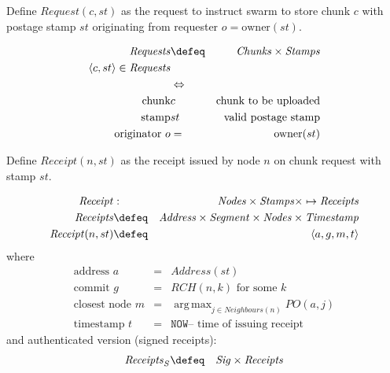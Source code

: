 \begin{definition}
\label{def:push-sync-request}
Define  $\mathit{Request}(c,st)$ as the request  to instruct swarm to store chunk $c$ with postage stamp $st$ originating from requester $o=\mathrm{owner}(st)$. 

\begin{eqnarray}
\mathit{Requests}&\defeq&\mathit{Chunks}\times\mathit{Stamps}\\ 
\langle c, st\rangle\in\mathit{Requests} \\
&\Leftrightarrow&\\
\text{chunk}&c&\text{chunk to be uploaded}\\
\text{stamp}&st&\text{valid postage stamp}\\
\text{originator } o&=&\mathrm{owner}(st)
\end{eqnarray}
\end{definition}

\begin{definition}
\label{def:receipt}
Define  $\mathit{Receipt}(n,st)$ as the receipt issued by node $n$ on chunk request with stamp $st$.

\begin{eqnarray}
\mathit{Receipt}&:&\mathit{Nodes}\times\mathit{Stamps}\times\mapsto\mathit{Receipts}\\ 
\mathit{Receipts} &\defeq&
\mathit{Address}\times\mathit{Segment}\times\mathit{Nodes}\times\mathit{Timestamp}\\
\mathit{Receipt}(n, st) &\defeq& \langle
a, g, m, t \rangle
\end{eqnarray}
where
\begin{eqnarray}
\text{address } a&=&\mathit{Address}(st)\\
\text{commit } g&=&\mathit{RCH}(n,k) \text{ for some }k\\
\text{closest node } m&=&\operatorname{arg\,max}_{j\in\mathit{Neighbours}(n)}\mathit{PO}(a,j)\\
\text{timestamp } t&=&\texttt{NOW} \text{-- time of issuing receipt}
\end{eqnarray}
and authenticated version (signed receipts):
\begin{eqnarray}
\mathit{Receipts}_S &\defeq&\mathit{Sig}\times\mathit{Receipts}
 \end{eqnarray}

\end{definition}

